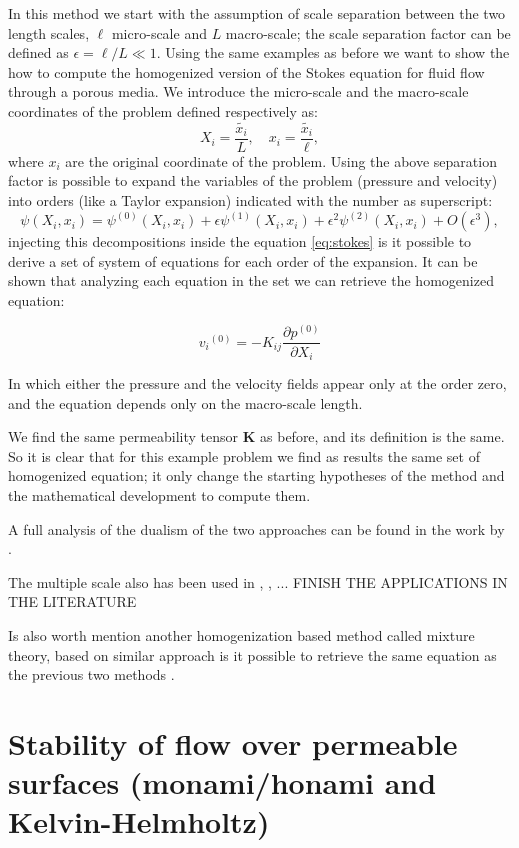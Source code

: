 In this method we start with the assumption of scale separation between the two length scales, $\ell$ micro-scale and $L$ macro-scale; the scale separation factor can be defined as $\epsilon = \ell/L \ll 1$.
Using the same examples as before we want to show the how to compute the homogenized version of the Stokes equation for fluid flow through a porous media.
We introduce the micro-scale and the macro-scale coordinates of the problem defined respectively as:
$$
 X_i = \dfrac{\tilde{x_i}}{L}, \quad   x_i = \dfrac{\tilde{x_i}}{\ell},
$$
where $x_i$ are the original coordinate of the problem.
Using the above separation factor is possible to expand the variables of the problem (pressure and velocity) into orders (like a Taylor expansion) indicated with the number as superscript:
$$
\psi(X_i, x_i) = \psi^{(0)}(X_i, x_i)  +\epsilon \psi^{(1)}(X_i, x_i) +\epsilon^2 \psi^{(2)}(X_i, x_i) +O(\epsilon^3),
$$
injecting this decompositions inside the equation \eqref{eq:stokes} is it possible to derive a set of system of equations for each order of the expansion.
It can be shown that analyzing each equation in the set we can retrieve the homogenized equation:

\begin{equation}
{v_i}^{(0)} = -K_{ij} \dfrac{\partial p^{(0)}}{\partial X_i}
\label{eq:darcy_ms}
\end{equation} 

In which either the pressure and the velocity fields appear only at the order zero, and the equation depends only on the macro-scale length.

We find the same permeability tensor $\mathbf{K}$ as before, and its definition is the same.
So it is clear that for this example problem we find as results the same set of homogenized equation; it only change the starting hypotheses of the method and the mathematical development to compute them.

A full analysis of the dualism of the two approaches can be found in the work by \cite{davit2013homogenization}.

The multiple scale also has been used in \citet{zampogna2016fluid}, \citet{ugis}, ... FINISH THE APPLICATIONS IN THE LITERATURE


Is also worth mention another homogenization based method called mixture theory, based on similar approach is it possible to retrieve the same equation as the previous two methods \citet{rajagopal2007hierarchy}.




\section{Stability of flow over permeable surfaces (monami/honami and Kelvin-Helmholtz)}
\label{sec:stability}

